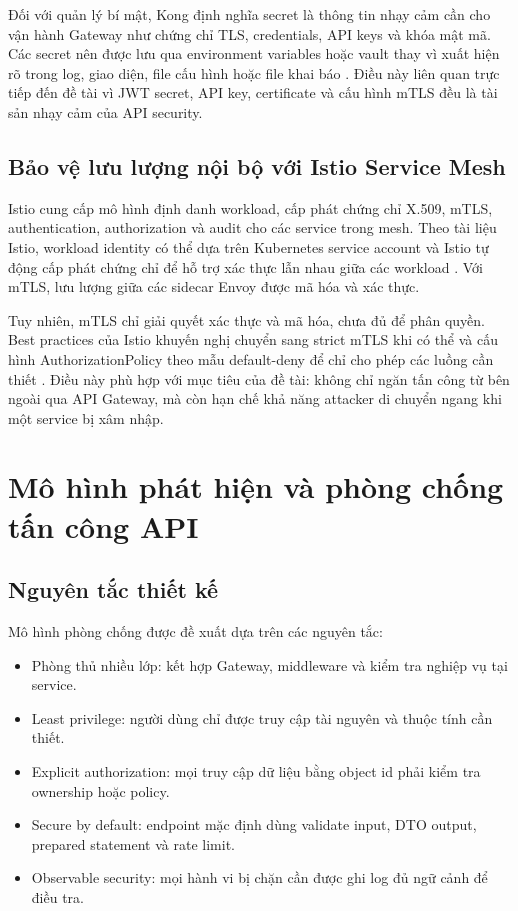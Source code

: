 \documentclass[14pt,a4paper]{extreport}
\begin{document}
Đối với quản lý bí mật, Kong định nghĩa secret là thông tin nhạy cảm cần cho vận hành Gateway như chứng chỉ TLS, credentials, API keys và khóa mật mã. Các secret nên được lưu qua environment variables hoặc vault thay vì xuất hiện rõ trong log, giao diện, file cấu hình hoặc file khai báo \cite{kongsecrets}. Điều này liên quan trực tiếp đến đề tài vì JWT secret, API key, certificate và cấu hình mTLS đều là tài sản nhạy cảm của API security.

\section{Bảo vệ lưu lượng nội bộ với Istio Service Mesh}
Istio cung cấp mô hình định danh workload, cấp phát chứng chỉ X.509, mTLS, authentication, authorization và audit cho các service trong mesh. Theo tài liệu Istio, workload identity có thể dựa trên Kubernetes service account và Istio tự động cấp phát chứng chỉ để hỗ trợ xác thực lẫn nhau giữa các workload \cite{istiosecurity}. Với mTLS, lưu lượng giữa các sidecar Envoy được mã hóa và xác thực.

Tuy nhiên, mTLS chỉ giải quyết xác thực và mã hóa, chưa đủ để phân quyền. Best practices của Istio khuyến nghị chuyển sang strict mTLS khi có thể và cấu hình AuthorizationPolicy theo mẫu default-deny để chỉ cho phép các luồng cần thiết \cite{istiobestpractices}. Điều này phù hợp với mục tiêu của đề tài: không chỉ ngăn tấn công từ bên ngoài qua API Gateway, mà còn hạn chế khả năng attacker di chuyển ngang khi một service bị xâm nhập.

\chapter{Mô hình phát hiện và phòng chống tấn công API}

\section{Nguyên tắc thiết kế}
Mô hình phòng chống được đề xuất dựa trên các nguyên tắc:
\begin{itemize}
  \item Phòng thủ nhiều lớp: kết hợp Gateway, middleware và kiểm tra nghiệp vụ tại service.
  \item Least privilege: người dùng chỉ được truy cập tài nguyên và thuộc tính cần thiết.
  \item Explicit authorization: mọi truy cập dữ liệu bằng object id phải kiểm tra ownership hoặc policy.
  \item Secure by default: endpoint mặc định dùng validate input, DTO output, prepared statement và rate limit.
  \item Observable security: mọi hành vi bị chặn cần được ghi log đủ ngữ cảnh để điều tra.
\end{itemize}
\end{document}
